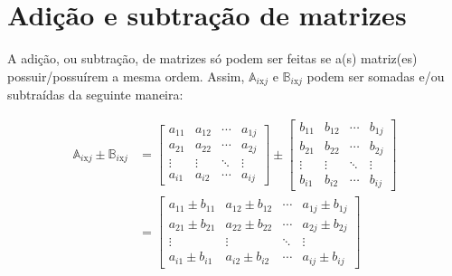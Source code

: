 \section{Adição e subtração de matrizes}

A adição, ou subtração, de matrizes só podem ser feitas se a(s) matriz(es) possuir/possuírem a mesma ordem. Assim, $\mathbb{A}_{i\mathrm{x}j}$
e $\mathbb{B}_{i\mathrm{x}j}$ podem ser somadas e/ou subtraídas da seguinte maneira:


\begin{ceqn}
	\begin{align*}
		\mathbb{A}_{i\mathrm{x}j}\pm\mathbb{B}_{i\mathrm{x}j} & = \begin{bmatrix}a_{11} & a_{12} & \cdots & a_{1j}\\
	a_{21} & a_{22} & \cdots & a_{2j}\\
	\vdots & \vdots & \ddots & \vdots\\
	a_{i1} & a_{i2} & \cdots & a_{ij}
	\end{bmatrix}\pm\begin{bmatrix}b_{11} & b_{12} & \cdots & b_{1j}\\
	b_{21} & b_{22} & \cdots & b_{2j}\\
	\vdots & \vdots & \ddots & \vdots\\
	b_{i1} & b_{i2} & \cdots & b_{ij}
	\end{bmatrix}\\
	& = \begin{bmatrix}a_{11}\pm b_{11} & a_{12}\pm b_{12} & \cdots & a_{1j}\pm b_{1j}\\
	a_{21}\pm b_{21} & a_{22}\pm b_{22} & \cdots & a_{2j}\pm b_{2j}\\
	\vdots & \vdots & \ddots & \vdots\\
	a_{i1}\pm b_{i1} & a_{i2}\pm b_{i2} & \cdots & a_{ij}\pm b_{ij}
	\end{bmatrix}
	\end{align*}
\end{ceqn}

